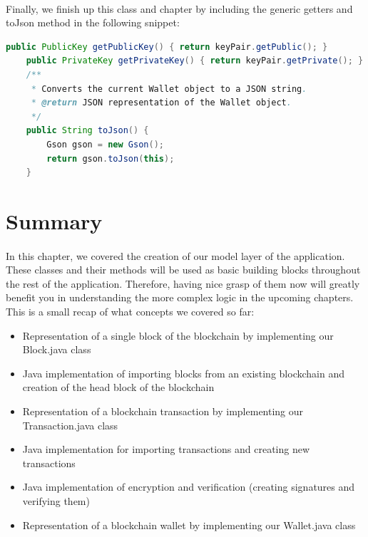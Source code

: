 \documentclass[12pt,a4paper]{report}
\begin{document}
\paragraph{}
Finally, we finish up this class and chapter by including the generic getters and toJson method in the following snippet:

\begin{lstlisting}[language=Java]
    public PublicKey getPublicKey() { return keyPair.getPublic(); }
    public PrivateKey getPrivateKey() { return keyPair.getPrivate(); }
    /**
     * Converts the current Wallet object to a JSON string.
     * @return JSON representation of the Wallet object.
     */
    public String toJson() {
        Gson gson = new Gson();
        return gson.toJson(this);
    }

\end{lstlisting}



\paragraph{}


\section{Summary}

\paragraph{}
In this chapter, we covered the creation of our model layer of the application. These classes and their methods will be used as basic building blocks throughout the rest of the application. Therefore, having nice grasp of them now will greatly benefit you in understanding the more complex logic in the upcoming chapters. This is a small recap of what concepts we covered so far:
\begin{itemize}
    \item Representation of a single block of the blockchain by implementing our Block.java class
    \item Java implementation of importing blocks from an existing blockchain and creation of the head block of the blockchain
    \item Representation of a blockchain transaction by implementing our Transaction.java class
    \item Java implementation for importing transactions and creating new transactions
    \item Java implementation of encryption and verification (creating signatures and verifying them)
    \item Representation of a blockchain wallet by implementing our Wallet.java class
\end{itemize}
\end{document}
